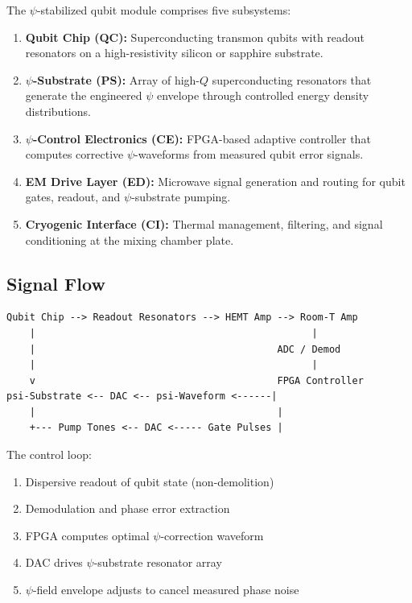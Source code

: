 \documentclass[11pt,letterpaper]{article}
\begin{document}
The $\psi$-stabilized qubit module comprises five subsystems:

\begin{enumerate}
\item \textbf{Qubit Chip (QC):} Superconducting transmon qubits with
readout resonators on a high-resistivity silicon or sapphire substrate.

\item \textbf{$\psi$-Substrate (PS):} Array of high-$Q$ superconducting
resonators that generate the engineered $\psi$ envelope through
controlled energy density distributions.

\item \textbf{$\psi$-Control Electronics (CE):} FPGA-based adaptive
controller that computes corrective $\psi$-waveforms from measured qubit
error signals.

\item \textbf{EM Drive Layer (ED):} Microwave signal generation and
routing for qubit gates, readout, and $\psi$-substrate pumping.

\item \textbf{Cryogenic Interface (CI):} Thermal management, filtering,
and signal conditioning at the mixing chamber plate.
\end{enumerate}

\subsection{Signal Flow}

\begin{verbatim}
Qubit Chip --> Readout Resonators --> HEMT Amp --> Room-T Amp
    |                                                |
    |                                          ADC / Demod
    |                                                |
    v                                          FPGA Controller
psi-Substrate <-- DAC <-- psi-Waveform <------|
    |                                          |
    +--- Pump Tones <-- DAC <----- Gate Pulses |
\end{verbatim}

The control loop:
\begin{enumerate}
\item Dispersive readout of qubit state (non-demolition)
\item Demodulation and phase error extraction
\item FPGA computes optimal $\psi$-correction waveform
\item DAC drives $\psi$-substrate resonator array
\item $\psi$-field envelope adjusts to cancel measured phase noise
\end{enumerate}
\end{document}
